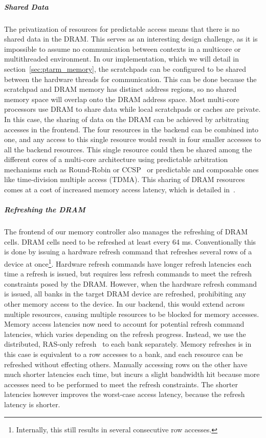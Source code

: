 \subparagraph{Shared Data}
The privatization of resources for predictable access means that there is no shared data in the DRAM.
This serves as an interesting design challenge, as it is impossible to assume no communication between contexts in a multicore or multithreaded environment.
In our implementation, which we will detail in section~\ref{sec:ptarm_memory}, the scratchpads can be configured to be shared between the hardware threads for communication.  
This can be done because the scratchpad and DRAM memory has distinct address regions, so no shared memory space will overlap onto the DRAM address space. 
Most multi-core processors use DRAM to share data while local scratchpads or caches are private.
In this case, the sharing of data on the DRAM can be achieved by arbitrating accesses in the frontend.
The four resources in the backend can be combined into one, and any access to this single resource would result in four smaller accesses to all the backend resources. 
This single resource could then be shared among the different cores of a multi-core architecture using predictable arbitration mechanisms such as Round-Robin or CCSP~\cite{Akesson08} or predictable and composable ones like time-division multiple access (TDMA). 
This sharing of DRAM resources comes at a cost of increased memory access latency, which is detailed in~\cite{ReinekeLiuPatelKimLee11_PRETDRAMControllerBankPrivatizationForPredictability}. 

\subparagraph{Refreshing the DRAM}
The frontend of our memory controller also manages the refreshing of DRAM cells. 
DRAM cells need to be refreshed at least every 64 ms.
Conventionally this is done by issuing a hardware refresh command that refreshes several rows of a device at once\footnote{Internally, this still results in several consecutive row accesses.}.
Hardware refresh commands have longer refresh latencies each time a refresh is issued, but requires less refresh commands to meet the refresh constraints posed by the DRAM.
However, when the hardware refresh command is issued, all banks in the target DRAM device are refreshed, prohibiting any other memory access to the device.
In our backend, this would extend across multiple resources, causing multiple resources to be blocked for memory accesses. 
Memory access latencies now need to account for potential refresh command latencies, which varies depending on the refresh progress.  
Instead, we use the distributed, RAS-only refresh~\cite{spec:micronddr2} to each bank separately.
Memory refreshes is in this case is equivalent to a row accesses to a bank, and each resource can be refreshed without effecting others.
Manually accessing rows on the other have much shorter latencies each time, but incurs a slight bandwidth hit because more accesses need to be performed to meet the refresh constraints.
The shorter latencies however improves the worst-case access latency, because the refresh latency is shorter.


